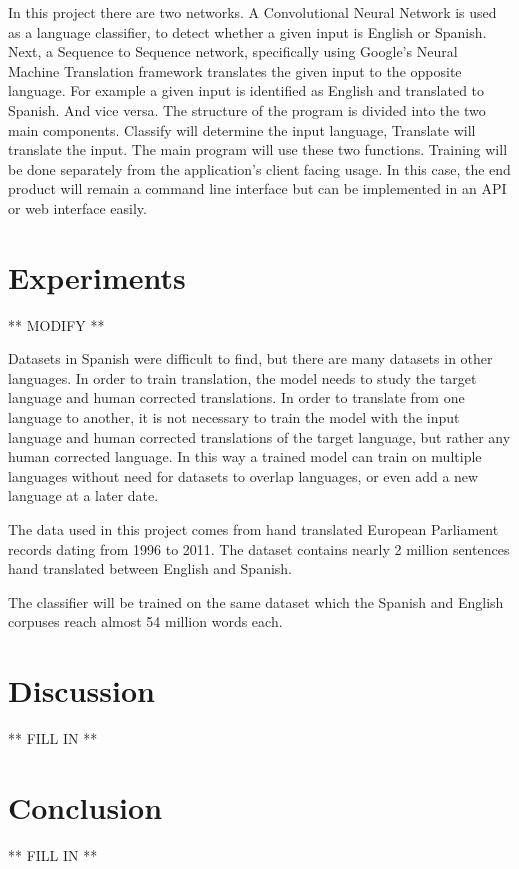 \documentclass[10pt,a4paper]{article}
\begin{document}
  In this project there are two networks. A Convolutional Neural Network is used as a language classifier, to detect whether a given input is English or Spanish. Next, a Sequence to Sequence network, specifically using Google's Neural Machine Translation framework translates the given input to the opposite language. For example a given input is identified as English and translated to Spanish. And vice versa. The structure of the program is divided into the two main components. Classify will determine the input language, Translate will translate the input. The main program will use these two functions. Training will be done separately from the application's client facing usage. In this case, the end product will remain a command line interface but can be implemented in an API or web interface easily.

\section{Experiments}
** MODIFY **

  Datasets in Spanish were difficult to find, but there are many datasets in other languages. In order to train translation, the model needs to study the target language and human corrected translations. In order to translate from one language to another, it is not necessary to train the model with the input language and human corrected translations of the target language, but rather any human corrected language. In this way a trained model can train on multiple languages without need for datasets to overlap languages, or even add a new language at a later date.

  The data used in this project comes from hand translated European Parliament records dating from 1996 to 2011. The dataset contains nearly 2 million sentences hand translated between English and Spanish.

  The classifier will be trained on the same dataset which the Spanish and English corpuses reach almost 54 million words each.

\clearpage

\section{Discussion}
** FILL IN **

\section{Conclusion}
** FILL IN **
\end{document}

